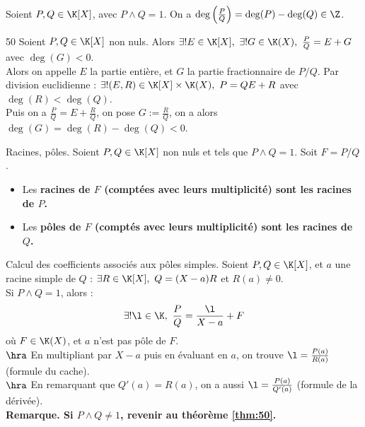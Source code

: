 \documentclass[11pt]{article}
\begin{document}
\vspace*{-0.7cm}

\begin{prop}{}{}
    Soient $P,Q\in\K[X]$, avec $P\land Q = 1$. On a $\deg\left( \frac{P}{Q} \right)=\deg(P)-\deg(Q)\in\Z$.
\end{prop}

\vspace*{-0.7cm}

\begin{thm}{}{50}
    Soient $P,Q\in\K[X]$ non nuls. Alors $\exists!E\in\K[X], ~ \exists!G\in\K(X), ~ \frac{P}{Q}=E+G$ avec $\deg(G)<0$.\\
    Alors on appelle $E$ la partie entière, et $G$ la partie fractionnaire de $P/Q$.
    \tcblower
    Par division euclidienne : $\exists!(E,R)\in\K[X]\times\K(X), ~ P=QE+R$ avec $\deg(R)<\deg(Q)$.\\
    Puis on a $\frac{P}{Q}=E+\frac{R}{Q}$, on pose $G:=\frac{R}{Q}$, on a alors $\deg(G)=\deg(R)-\deg(Q)<0$.
\end{thm}

\begin{defi}{Racines, pôles.}{}
    Soient $P,Q\in\K[X]$ non nuls et tels que $P\land Q = 1$. Soit $F=P/Q$.
    \begin{itemize}
        \item Les \bf{racines} de $F$ (comptées avec leurs multiplicité) sont les racines de $P$.
        \item Les \bf{pôles} de $F$ (comptés avec leurs multiplicité) sont les racines de $Q$.
    \end{itemize}
\end{defi}

\begin{thm}{Calcul des coefficients associés aux pôles simples.}{}
    Soient $P,Q\in\K[X]$, et $a$ une racine simple de $Q$ : $\exists R \in \K[X], ~ Q=(X-a)R$ et $R(a)\neq0$.\\
    Si $P\land Q = 1$, alors :
    \begin{equation*}
        \exists!\l \in \K, ~ \frac{P}{Q} = \frac{\l}{X-a} + F
    \end{equation*}
    où $F\in\K(X)$, et $a$ n'est pas pôle de $F$.\\
    $\hra$ En multipliant par $X-a$ puis en évaluant en $a$, on trouve $\l=\frac{P(a)}{R(a)}$ (formule du cache).\\
    $\hra$ En remarquant que $Q'(a)=R(a)$, on a aussi $\l=\frac{P(a)}{Q'(a)}$ (formule de la dérivée).\\
    \bf{Remarque.} Si $P\land Q\neq 1$, revenir au théorème \ref{thm:50}.
\end{thm}
\end{document}
